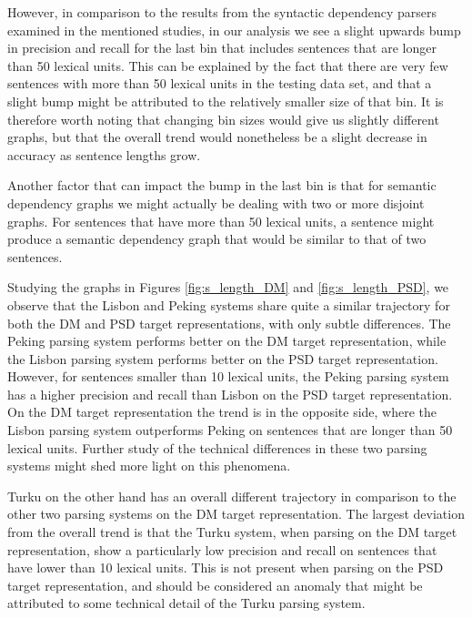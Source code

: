 However, in comparison to the results from the syntactic dependency parsers examined in the mentioned studies, in our analysis we see a slight upwards bump in precision and recall for the last bin that includes sentences that are longer than 50 lexical units. This can be explained by the fact that there are very few sentences with more than 50 lexical units in the testing data set, and that a slight bump might be attributed to the relatively smaller size of that bin. It is therefore worth noting that changing bin sizes would give us slightly different graphs, but that the overall trend would nonetheless be a slight decrease in accuracy as sentence lengths grow.

Another factor that can impact the bump in the last bin is that for semantic dependency graphs we might actually be dealing with two or more disjoint graphs. For sentences that have more than 50 lexical units, a sentence might produce a semantic dependency graph that would be similar to that of two sentences.

Studying the graphs in Figures \ref{fig:s_length_DM} and \ref{fig:s_length_PSD}, we observe that the Lisbon and Peking systems share quite a similar trajectory for both the DM and PSD target representations, with only subtle differences. The Peking parsing system performs better on the DM target representation, while the Lisbon parsing system performs better on the PSD target representation. However, for sentences smaller than 10 lexical units, the Peking parsing system has a higher precision and recall than Lisbon on the PSD target representation. On the DM target representation the trend is in the opposite side, where the Lisbon parsing system outperforms Peking on sentences that are longer than 50 lexical units. Further study of the technical differences in these two parsing systems might shed more light on this phenomena.

Turku on the other hand has an overall different trajectory in comparison to the other two parsing systems on the DM target representation. The largest deviation from the overall trend is that the Turku system, when parsing on the DM target representation, show a particularly low precision and recall on sentences that have lower than 10 lexical units. This is not present when parsing on the PSD target representation, and should be considered an anomaly that might be attributed to some technical detail of the Turku parsing system.


